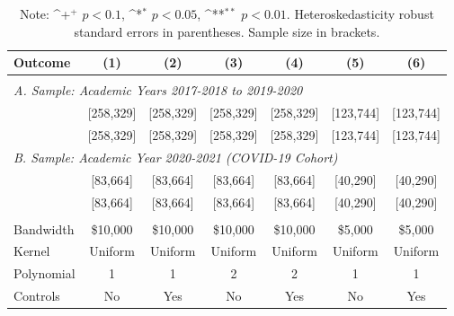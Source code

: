 \documentclass[12pt,letterpaper,oneside]{book}
\newcommand{\basepath}{g:/My Drive/Grad School}
\newcommand{\basepath}{basepath}
\begin{document}
\clearpage

\begin{table}[h!]\centering
    \def\sym#1{\ifmmode^{#1}\else\(^{#1}\)\fi}
    \caption{Estimated Impacts of Recent Cal Grant Receipt on Political Participation\label{tab:covid1}}
    \begin{tabular}{l*{6}{c}}
        \hline\hline
        Outcome&\multicolumn{1}{c}{(1)}&\multicolumn{1}{c}{(2)}&\multicolumn{1}{c}{(3)}&\multicolumn{1}{c}{(4)}&\multicolumn{1}{c}{(5)}&\multicolumn{1}{c}{(6)}\\
        \hline
        &&&&&&\\
        \multicolumn{7}{l}{\textit{A. Sample: Academic Years 2017-2018 to 2019-2020}} \\ [0.5em]
        
        &   [258,329]     &   [258,329]     &     [258,329]     &   [258,329]    &   [123,744]       &   [123,744] \\[0.5em]

        
        &   [258,329]     &   [258,329]     &     [258,329]     &   [258,329]    &   [123,744]       &   [123,744] \\[0.5em]

        \multicolumn{7}{l}{\textit{B. Sample: Academic Year 2020-2021 (COVID-19 Cohort)}} \\ [0.5em]

        
        &   [83,664]     &   [83,664]      &     [83,664]    &   [83,664]   &   [40,290]       &   [40,290] \\[0.5em]

        
        &   [83,664]     &   [83,664]      &     [83,664]    &   [83,664]   &   [40,290]       &   [40,290] \\

        &&&&&&\\

        \hline
        Bandwidth & \$10,000       &   \$10,000        &   \$10,000        &   \$10,000       &   \$5,000        &   \$5,000        \\
        Kernel&   Uniform      &   Uniform        &   Uniform        &   Uniform       &   Uniform       &   Uniform       \\
        Polynomial&   1       &   1        &   2        &   2       &   1       &   1       \\
        Controls&   No       &   Yes        &   No        &   Yes        &   No        &   Yes        \\
        \hline
    \end{tabular}
    \caption*{\footnotesize Note: \sym{+} \(p<0.1\), \sym{*} \(p<0.05\), \sym{**} \(p<0.01\). Heteroskedasticity robust standard errors in parentheses. Sample size in brackets.}
\end{table}
\end{document}
